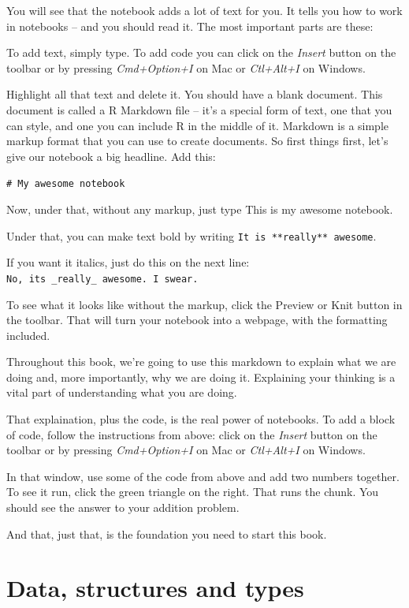 \documentclass[
]{book}
\begin{document}
You will see that the notebook adds a lot of text for you. It tells you how to work in notebooks -- and you should read it. The most important parts are these:

To add text, simply type. To add code you can click on the \emph{Insert} button on the toolbar or by pressing \emph{Cmd+Option+I} on Mac or \emph{Ctl+Alt+I} on Windows.

Highlight all that text and delete it. You should have a blank document. This document is called a R Markdown file -- it's a special form of text, one that you can style, and one you can include R in the middle of it. Markdown is a simple markup format that you can use to create documents. So first things first, let's give our notebook a big headline. Add this:

\texttt{\#\ My\ awesome\ notebook}

Now, under that, without any markup, just type This is my awesome notebook.

Under that, you can make text bold by writing \texttt{It\ is\ **really**\ awesome}.

If you want it italics, just do this on the next line: \texttt{No,\ it\textquotesingle{}s\ \_really\_\ awesome.\ I\ swear.}

To see what it looks like without the markup, click the Preview or Knit button in the toolbar. That will turn your notebook into a webpage, with the formatting included.

Throughout this book, we're going to use this markdown to explain what we are doing and, more importantly, why we are doing it. Explaining your thinking is a vital part of understanding what you are doing.

That explaination, plus the code, is the real power of notebooks. To add a block of code, follow the instructions from above: click on the \emph{Insert} button on the toolbar or by pressing \emph{Cmd+Option+I} on Mac or \emph{Ctl+Alt+I} on Windows.

In that window, use some of the code from above and add two numbers together. To see it run, click the green triangle on the right. That runs the chunk. You should see the answer to your addition problem.

And that, just that, is the foundation you need to start this book.

\hypertarget{data-structures-and-types}{%
\chapter{Data, structures and types}\label{data-structures-and-types}}
\end{document}
